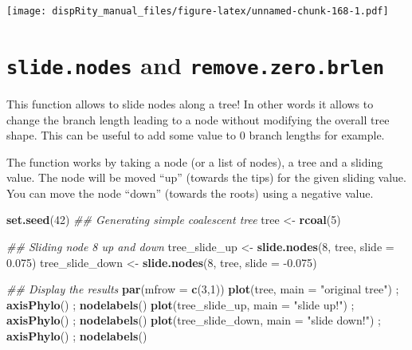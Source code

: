 \documentclass[
]{book}
\newenvironment{Shaded}{\begin{snugshade}}{\end{snugshade}}
\newcommand{\CommentTok}[1]{\textcolor[rgb]{0.56,0.35,0.01}{\textit{#1}}}
\newcommand{\DataTypeTok}[1]{\textcolor[rgb]{0.13,0.29,0.53}{#1}}
\newcommand{\DecValTok}[1]{\textcolor[rgb]{0.00,0.00,0.81}{#1}}
\newcommand{\FloatTok}[1]{\textcolor[rgb]{0.00,0.00,0.81}{#1}}
\newcommand{\KeywordTok}[1]{\textcolor[rgb]{0.13,0.29,0.53}{\textbf{#1}}}
\newcommand{\NormalTok}[1]{#1}
\newcommand{\StringTok}[1]{\textcolor[rgb]{0.31,0.60,0.02}{#1}}
\begin{document}
\texttt{[image: dispRity\_manual\_files/figure-latex/unnamed-chunk-168-1.pdf]}

\hypertarget{slide.nodes-and-remove.zero.brlen}{%
\section{\texorpdfstring{\texttt{slide.nodes} and \texttt{remove.zero.brlen}}{slide.nodes and remove.zero.brlen}}\label{slide.nodes-and-remove.zero.brlen}}

This function allows to slide nodes along a tree!
In other words it allows to change the branch length leading to a node without modifying the overall tree shape.
This can be useful to add some value to 0 branch lengths for example.

The function works by taking a node (or a list of nodes), a tree and a sliding value.
The node will be moved ``up'' (towards the tips) for the given sliding value.
You can move the node ``down'' (towards the roots) using a negative value.

\begin{Shaded}
\begin{Highlighting}[]
\KeywordTok{set.seed}\NormalTok{(}\DecValTok{42}\NormalTok{)}
\CommentTok{\#\# Generating simple coalescent tree}
\NormalTok{tree \textless{}{-}}\StringTok{ }\KeywordTok{rcoal}\NormalTok{(}\DecValTok{5}\NormalTok{)}

\CommentTok{\#\# Sliding node 8 up and down}
\NormalTok{tree\_slide\_up \textless{}{-}}\StringTok{ }\KeywordTok{slide.nodes}\NormalTok{(}\DecValTok{8}\NormalTok{, tree, }\DataTypeTok{slide =} \FloatTok{0.075}\NormalTok{)}
\NormalTok{tree\_slide\_down \textless{}{-}}\StringTok{ }\KeywordTok{slide.nodes}\NormalTok{(}\DecValTok{8}\NormalTok{, tree, }\DataTypeTok{slide =} \FloatTok{{-}0.075}\NormalTok{)}

\CommentTok{\#\# Display the results}
\KeywordTok{par}\NormalTok{(}\DataTypeTok{mfrow =} \KeywordTok{c}\NormalTok{(}\DecValTok{3}\NormalTok{,}\DecValTok{1}\NormalTok{))}
\KeywordTok{plot}\NormalTok{(tree, }\DataTypeTok{main =} \StringTok{"original tree"}\NormalTok{) ; }\KeywordTok{axisPhylo}\NormalTok{() ; }\KeywordTok{nodelabels}\NormalTok{()}
\KeywordTok{plot}\NormalTok{(tree\_slide\_up, }\DataTypeTok{main =} \StringTok{"slide up!"}\NormalTok{) ; }\KeywordTok{axisPhylo}\NormalTok{() ; }\KeywordTok{nodelabels}\NormalTok{()}
\KeywordTok{plot}\NormalTok{(tree\_slide\_down, }\DataTypeTok{main =} \StringTok{"slide down!"}\NormalTok{) ; }\KeywordTok{axisPhylo}\NormalTok{() ; }\KeywordTok{nodelabels}\NormalTok{()}
\end{Highlighting}
\end{Shaded}
\end{document}
